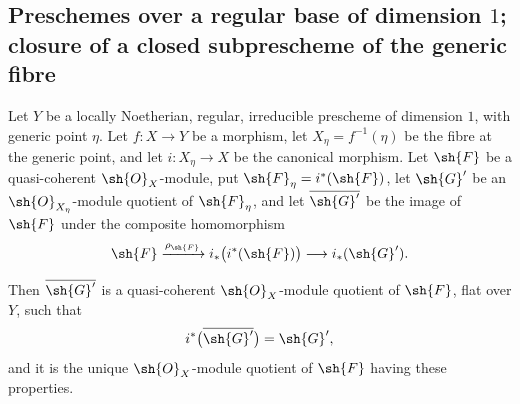 \subsection{Preschemes over a regular base of dimension
\texorpdfstring{$1$}{1}; closure of a closed subprescheme of the generic
fibre}
\label{subsection:IV.2.8}

\begin{proposition}[2.8.1]
\label{IV.2.8.1}
Let $Y$ be a locally Noetherian, regular, irreducible prescheme of
dimension $1$, with generic point $\eta$. Let $f:X\to Y$ be a
morphism, let $X_\eta=f^{-1}(\eta)$ be the fibre at the generic point,
and let $i:X_\eta\to X$ be the canonical morphism. Let $\sh{F}$ be a
quasi-coherent $\sh{O}_X$-module, put
$\sh{F}_\eta=i^*(\sh{F})$, let $\sh{G}'$ be an
$\sh{O}_{X_\eta}$-module quotient of $\sh{F}_\eta$, and let
$\overline{\sh{G}'}$ be the image of $\sh{F}$ under the composite
homomorphism~
\[
  \sh{F}
    \xrightarrow{\rho_{\sh{F}}}
  i_*\bigl(i^*(\sh{F})\bigr)
    \longrightarrow
  i_*(\sh{G}').
\]


Then $\overline{\sh{G}'}$ is a quasi-coherent
$\sh{O}_X$-module quotient of $\sh{F}$, flat over $Y$, such that
\[
  i^*\bigl(\overline{\sh{G}'}\bigr)=\sh{G}',
\]
and it is the unique $\sh{O}_X$-module quotient of $\sh{F}$ having
these properties.
\end{proposition}


